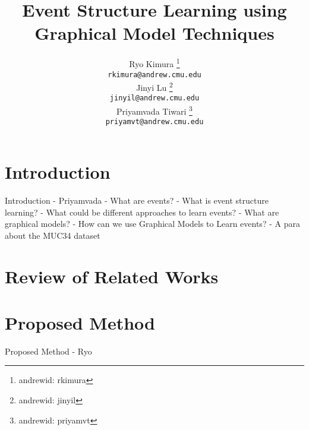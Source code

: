 \documentclass{article} %
\title{Event Structure Learning using Graphical Model Techniques}
\author{
    Ryo Kimura \thanks{andrewid: rkimura}\\
    \texttt{\small{rkimura@andrew.cmu.edu}} \\
    \And
    Jinyi Lu \thanks{andrewid: jinyil}\\
    \texttt{\small{jinyil@andrew.cmu.edu}} \\
    \And
    Priyamvada Tiwari \thanks{andrewid: priyamvt}\\
    \texttt{\small{priyamvt@andrew.cmu.edu}} \\
}
\begin{document}
\maketitle
\section{Introduction}
Introduction - Priyamvada
- What are events?
- What is event structure learning?
- What could be different approaches to learn events?
- What are graphical models?
- How can we use Graphical Models to Learn events?
- A para about the MUC34 dataset

\section{Review of Related Works}


\section{Proposed Method}
Proposed Method - Ryo

\printbibliography
\end{document}
